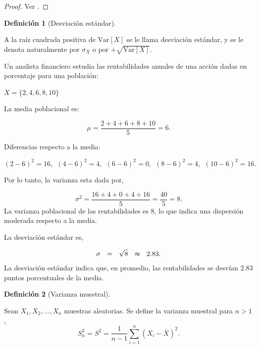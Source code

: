 \documentclass[
  us-letterpaper,
]{scrreprt}
\theoremstyle{plain}
\theoremstyle{definition}
\newtheorem{definition}{Definición}[chapter]
\theoremstyle{definition}
\theoremstyle{remark}
\begin{document}
\begin{proof}
Ver \autocite{castaneda2012introduction}.
\end{proof}

\begin{definition}[Desviación
estándar]\protect\hypertarget{def-sd}{}\label{def-sd}

A la raíz cuadrada positiva de \(\mathrm{Var}[X]\) se le llama
desviación estándar, y se le denota naturalmente por \(\sigma_X\) o por
\(+ \sqrt{\mathrm{Var}[X]}\).

\end{definition}

\begin{tcolorbox}[enhanced jigsaw, colback=white, toptitle=1mm, arc=.35mm, rightrule=.15mm, left=2mm, colframe=quarto-callout-caution-color-frame, breakable, leftrule=.75mm, colbacktitle=quarto-callout-caution-color!10!white, coltitle=black, opacityback=0, bottomtitle=1mm, bottomrule=.15mm, titlerule=0mm, opacitybacktitle=0.6, toprule=.15mm, title={\textbf{Análisis de Rentabilidades Anuales}}]

Un analista financiero estudia las rentabilidades anuales de una acción
dadas en porcentaje para una población:

\(X= \{ 2, 4, 6, 8, 10 \}\)

La media poblacional es:

\[\mu = \dfrac{ 2 + 4 + 6 + 8 + 10 }{ 5 } = 6.\]

Diferencias respecto a la media:

\((2-6)^2 = 16, \ \  (4-6)^2 = 4, \ \  (6-6)^2 = 0, \ \  (8-6)^2 = 4, \ \ (10-6)^2 = 16.\)

Por lo tanto, la varianza esta dada por,

\[ \sigma^2 = \dfrac{16 + 4 + 0 + 4 + 16   }{5} = \dfrac{40}{5} = 8. \]
La varianza poblacional de las rentabilidades es \(8\), lo que indica
una dispersión moderada respecto a la media.

La desviación estándar es,

\[
\sigma \ \ = \ \ \sqrt{8}  \ \  \thickapprox \ \ 2.83.
\] La desviación estándar indica que, en promedio, las rentabilidades se
desvían \(2.83\) puntos porcentuales de la media.

\end{tcolorbox}

\begin{definition}[Varianza
muestral]\protect\hypertarget{def-varianzam}{}\label{def-varianzam}

Sean \(X_1,X_2, \dots, X_n\) muestras aleatorias. Se define la varianza
muestral para \(n>1\),
\[ S_n^2=S^2=\frac{1}{n-1}\sum_{i=1}^n (X_i-\bar{X})^2   .\]

\end{definition}
\end{document}
